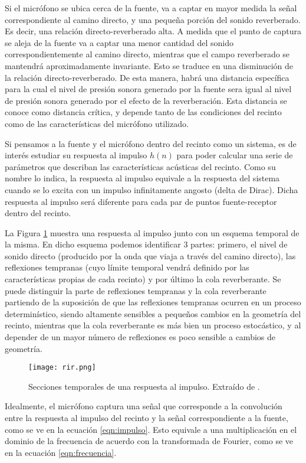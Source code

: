 Si el micrófono se ubica cerca de la fuente, va a captar en mayor medida la señal correspondiente al camino directo, y una pequeña porción del sonido reverberado. Es decir, una relación directo-reverberado alta. A medida que el punto de captura se aleja de la fuente va a captar una menor cantidad del sonido correspondientemente al camino directo, mientras que el campo reverberado se mantendrá aproximadamente invariante. Esto se traduce en una disminución de la relación directo-reverberado. 
De esta manera, habrá una distancia específica para la cual el nivel de presión sonora generado por la fuente sera igual al nivel de presión sonora generado por el efecto de la reverberación. Esta distancia se conoce como distancia crítica, y depende tanto de las condiciones del recinto como de las características del micrófono utilizado. 

Si pensamos a la fuente y el micrófono dentro del recinto como un sistema, es de interés estudiar su respuesta al impulso $h(n)$ para poder calcular una serie de parámetros que describan las características acústicas del recinto. Como su nombre lo indica, la respuesta al impulso equivale a la respuesta del sistema cuando se lo excita con un impulso infinitamente angosto (delta de Dirac). Dicha respuesta al impulso será diferente para cada par de puntos fuente-receptor dentro del recinto.   


La Figura \ref{fig:rir} muestra una respuesta al impulso junto con un esquema temporal de la misma. En dicho esquema podemos identificar 3 partes: primero, el nivel de sonido directo (producido por la onda que viaja a través del camino directo), las reflexiones tempranas (cuyo límite temporal vendrá definido por las características propias de cada recinto) y por último la cola reverberante. Se puede distinguir la parte de reflexiones tempranas y la cola reverberante partiendo de la suposición de que las reflexiones tempranas ocurren en un proceso determinístico, siendo altamente sensibles a pequeños cambios en la geometría del recinto, mientras que la cola reverberante es más bien un proceso estocástico, y al depender de un mayor número de reflexiones es poco sensible a cambios de geometría. 

\begin{figure}[H]
  \centering{}
  \texttt{[image: rir.png]}
  \caption{Secciones temporales de una respuesta al impulso. Extraído de \cite{rir}.}
  \label{fig:rir}
\end{figure}

Idealmente, el micrófono captura una señal que corresponde a la convolución entre la respuesta al impulso del recinto y la señal correspondiente a la fuente, como se ve en la ecuación \ref{eqn:impulso}. Esto equivale a una multiplicación en el dominio de la frecuencia de acuerdo con la transformada de Fourier, como se ve en la ecuación \ref{eqn:frecuencia}.  


